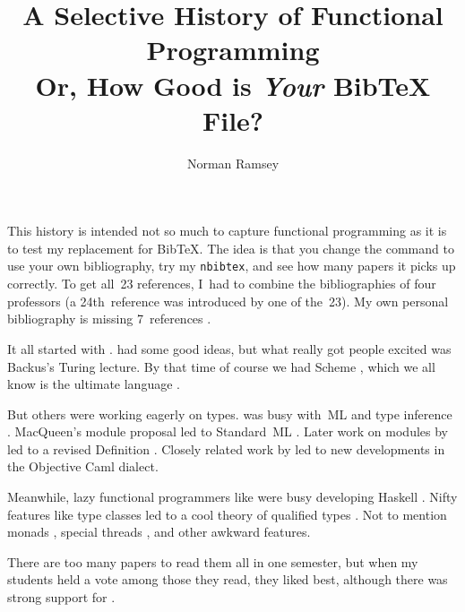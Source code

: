 \documentclass[twocolumn]{article}
\title{A Selective History of Functional Programming\\
        {\large Or, How Good is \emph{Your} Bib{\TeX} File?}}
\author{Norman Ramsey}
\begin{document}
\maketitle
\small

This history is intended not so much to capture functional programming
as it is to test my replacement for Bib{\TeX}.
The idea is that you change the
\verb++ command to use your own bibliography,
try my \texttt{nbibtex}, and see how many papers it picks up
correctly.
To get all~23 references, I~had to combine the bibliographies of four
professors (a 24th~reference was introduced by one of the~23). 
My own personal bibliography is missing 7~references
\citep{iverson::book,
  :lambda-ultimate-declarative,
  Backus:liberate-neumann,
  macqueen:MODULES-for-ml,
  milner-tofte-harper:definition:1990,
  jones:qualified-TYPES:booK,
  peyton-jones-launchbury:lazy-functional-state-threads:in}.




It all started with \cite{mccarthy:symbolic-recursive}.
\cite{iverson::book} had some good ideas, but what really got people
excited was Backus's \citeyearpar{Backus:liberate-neumann}
Turing lecture.
By that time of course we had Scheme \citep{sussman-steele:scheme:197},
which we all know is the ultimate language
 \citep{:lambda-ultimate-imperative,:lambda-ultimate-declarative,:lambda-ultimate-goto}.

But others were working eagerly on types.
\cite{milner:type-polymorphism-programming} was busy with~ML
and type inference \citep{damas-milner}.
MacQueen's \citeyearpar{macqueen:MODULES-for-ml} module proposal led to
Standard~ML \citep{milner-tofte-harper:definition:1990}.
Later work on modules by \cite{harper-lillibridge:sharing} led to
a revised Definition
\citep{milner-tofte-macqueen-harper}.
Closely related work by
\cite{leroy:modules:1994,leroy:functors:1995,leroy:modular-module-system}
led to new developments in the Objective Caml dialect.

Meanwhile, lazy functional programmers like
\cite{hughes:why-functional-matters} were busy developing Haskell 
\citep{peyton-jones:haskell:book}.
Nifty features like type classes
\citep{wadler-blott:ad-hoc-polymorphism} led to a cool theory of
qualified types \citep{jones:qualified-TYPES:booK}.
Not to mention monads \citep{wadler:essence-functional},
special threads
\citep{peyton-jones-launchbury:lazy-functional-state-threads:in},
and other awkward \citep{peyton-jones:awkward-squad} features.

There are too many papers to read them all in one semester, but when
my students held a vote among those they read, they liked
\cite{wadler-blott} best, although there was strong support for
\cite{leroy:separate-compilation}. 



\providecommand\includeftpref{} %


\end{document}
